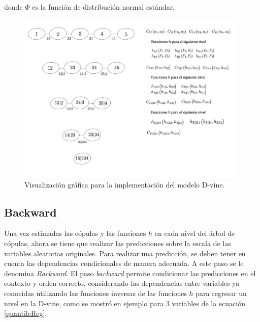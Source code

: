 donde $\Phi$ es la función de distribución normal estándar.

\begin{figure}[H]
    \centering
    \includegraphics[height = 13 cm, width = 0.98\textwidth]{Imagenes/Construccion.jpeg}
    \caption{Visualización gráfica para la implementación del modelo D-vine.}
    \label{fig:construccion}
\end{figure}


\subsection{Backward}

Una vez estimadas las cópulas y las funciones $h$  en cada nivel del árbol de cópulas, ahora se tiene que realizar las predicciones sobre la escala de las variables aleatorias originales. Para realizar una predicción, se deben tener en cuenta las dependencias condicionales de manera adecuada. A este paso se le denomina \textit{Backward}. El paso \textit{backward} permite condicionar las predicciones en el contexto y orden correcto, considerando las dependencias entre variables ya conocidas utilizando las funciones inversas de las funciones $h$ para regresar un nivel en la D-vine, como se mostró en ejemplo para $3$ variables de la ecuación \eqref{quantileReg}.


